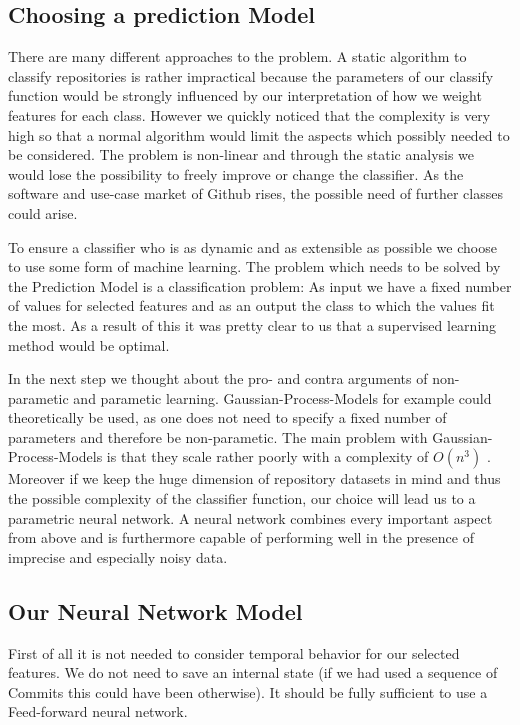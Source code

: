 \documentclass[paper=A4,pagesize=auto,12pt,headinclude=true,footinclude=true,BCOR=0mm,DIV=calc]{scrartcl}
\begin{document}
	\subsection{Choosing a prediction Model}
	There are many different approaches to the problem. A static algorithm to classify repositories is rather impractical because the parameters of our classify function would be strongly influenced by our interpretation of how we weight features for each class. However we quickly noticed that the complexity is very high so that a normal algorithm would limit the aspects which possibly needed to be considered. The problem is non-linear and through the static analysis we would lose the possibility to freely improve or change the classifier. As the software and use-case market of Github rises, the possible need of further classes could arise.
	
	
	To ensure a classifier who is as dynamic and as extensible as possible we choose to use some form of machine learning.
	The problem which needs to be solved by the Prediction Model is a classification problem: As input we have a fixed number of values for selected features  and as an output the class to which the values fit the most. As a result of this it was pretty clear to us that a supervised learning method would be optimal.
	
	
	In the next step we thought about the pro- and contra arguments of non-parametic and parametic learning.
	Gaussian-Process-Models for example could theoretically be used, as one does not need to specify a fixed number of parameters and therefore be non-parametic. 
	The main problem with Gaussian-Process-Models is that they scale rather poorly with a complexity of $O(n^{3})$ \cite{DukeUniversity}. Moreover if we keep the huge dimension of repository datasets in mind and thus the possible complexity of the classifier function, our choice will lead us to a parametric neural network. A neural network combines every important aspect from above and is furthermore capable of performing well in the presence of imprecise and especially noisy data.
	
	\subsection{Our Neural Network Model}
	First of all it is not needed to consider temporal behavior for our selected features. We do not need to save an internal state (if we had used a sequence of Commits this could have been otherwise). It should be fully sufficient to use a Feed-forward neural network.
	
\end{document}
